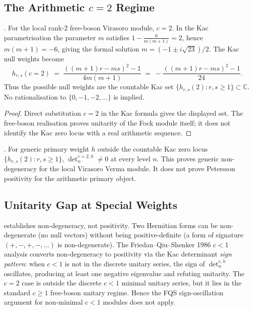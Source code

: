 \subsection{The Arithmetic \(c=2\) Regime}
\label{v4-arith:vb:c=2-regime}

\begin{proposition}[Kac at \(c=2\)]
\label{v4-arith:vb:prop:kac-non-vanishing}
\ClaimStatusProvedHere. For the local rank-\(2\) free-boson Virasoro
module, \(c=2\). In the Kac parametrisation the parameter \(m\)
satisfies
\(1-\tfrac{6}{m(m+1)}=2\), hence \(m(m+1)=-6\), giving the formal
solution \(m=(-1\pm i\sqrt{23})/2\). The Kac null weights become
\begin{equation}
h_{r,s}(c=2)\;=\;\frac{((m+1)r-ms)^{2}-1}{4m(m+1)}\;=\;-\frac{((m+1)r-ms)^{2}-1}{24}.
\end{equation}
Thus the possible null weights are the countable Kac set
\(\{h_{r,s}(2):r,s\geq1\}\subset\mathbb{C}\). No rationalisation to
\(\{0,-1,-2,\ldots\}\) is implied.
\end{proposition}

\begin{proof}
Direct substitution \(c=2\) in the Kac formula gives the displayed
set. The free-boson realisation proves unitarity of the Fock module
itself; it does not identify the Kac zero locus with a real arithmetic
sequence.
\end{proof}

\begin{corollary}
\label{v4-arith:vb:cor:no-generic-null}
\ClaimStatusProvedHere. For generic primary weight \(h\) outside the
countable Kac zero locus \(\{h_{r,s}(2):r,s\geq1\}\),
\(\det_{n}^{c=2,h}\neq 0\) at every level \(n\). This proves generic
non-degeneracy for the local Virasoro Verma module. It does not prove
Petersson positivity for the arithmetic primary object.
\end{corollary}

\subsection{Unitarity Gap at Special Weights}
\label{v4-arith:vb:unitarity-gap}

\begin{remark}
\label{v4-arith:vb:rem:gap}
 establishes non-degeneracy,
not positivity. Two Hermitian forms can be non-degenerate (no null
vectors) without being positive-definite (a form of signature
\((+,-,+,-,\ldots)\) is non-degenerate). The Friedan--Qiu--Shenker 1986
\(c<1\) analysis converts non-degeneracy to positivity via the
Kac determinant \emph{sign pattern}: when \(c<1\) is not in the
discrete unitary series, the sign of \(\det_{n}^{c,h}\) oscillates,
producing at least one negative eigenvalue and refuting unitarity.
The \(c=2\) case is outside the discrete \(c<1\) minimal unitary series,
but it lies in the standard \(c\geq1\) free-boson unitary regime. Hence
the FQS sign-oscillation argument for non-minimal \(c<1\) modules does
not apply.
\end{remark}

